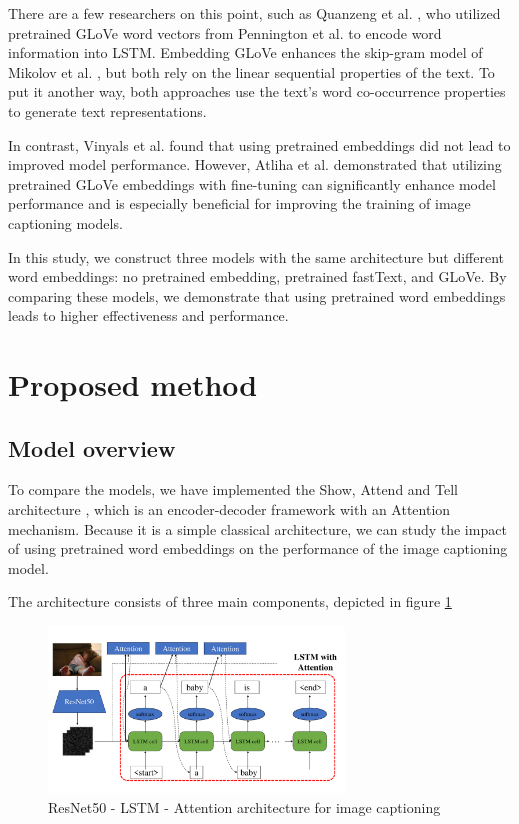 \documentclass[conference]{IEEEtran}
\begin{document}
There are a few researchers on this point, such as Quanzeng et al. \cite{you2016image}, who utilized pretrained GLoVe word vectors from Pennington et al. \cite{pennington2014GLoVe} to encode word information into LSTM. Embedding GLoVe enhances the skip-gram model of Mikolov et al. \cite{mikolov2013efficient}, but both rely on the linear sequential properties of the text. To put it another way, both approaches use the text’s word co-occurrence properties to generate text representations.


In contrast, Vinyals et al. \cite{vinyals2016show} found that using pretrained embeddings did not lead to improved model performance. However, Atliha et al. \cite{atliha2021pretrained} demonstrated that utilizing pretrained GLoVe embeddings with fine-tuning can significantly enhance model performance and is especially beneficial for improving the training of image captioning models.

In this study, we construct three models with the same architecture but different word embeddings: no pretrained embedding, pretrained fastText, and GLoVe. By comparing these models, we demonstrate that using pretrained word embeddings leads to higher effectiveness and performance.



\section{Proposed method}

\subsection{Model overview \label{sec:method}}
To compare the models, we have implemented the Show, Attend and Tell architecture \cite{xu2015show},
which is an encoder-decoder framework with an Attention mechanism. Because it is a simple classical architecture, we can study the impact of using pretrained word embeddings on the performance of the image captioning model.


The architecture consists of three main components, depicted in figure \ref{fig:CNN_LSTM_Attention}


\begin{figure}[h]
\centering
\includegraphics[width=0.7\textwidth]{assets/resnet50-lstm-attention.pdf}
  \caption{ResNet50 - LSTM - Attention architecture for image captioning}
  \label{fig:CNN_LSTM_Attention}
\end{figure}
\end{document}
